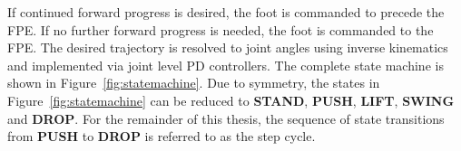 If continued forward progress is desired, the foot is commanded to precede the FPE. If no further forward progress is needed, the foot is commanded to the FPE. The desired trajectory is resolved to joint angles using inverse kinematics and implemented via joint level PD controllers. The complete state machine is shown in Figure~\ref{fig:statemachine}. Due to symmetry, the states in Figure~\ref{fig:statemachine} can be reduced to \textbf{STAND}, \textbf{PUSH}, \textbf{LIFT}, \textbf{SWING} and \textbf{DROP}. For the remainder of this thesis, the sequence of state transitions from \textbf{PUSH} to \textbf{DROP} is referred to as the step cycle.


